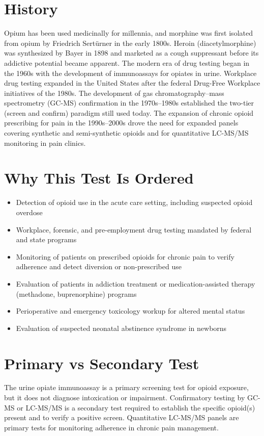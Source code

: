 \section*{History}
Opium has been used medicinally for millennia, and morphine was first isolated from opium by Friedrich Sertürner in the early 1800s. Heroin (diacetylmorphine) was synthesized by Bayer in 1898 and marketed as a cough suppressant before its addictive potential became apparent. The modern era of drug testing began in the 1960s with the development of immunoassays for opiates in urine. Workplace drug testing expanded in the United States after the federal Drug-Free Workplace initiatives of the 1980s. The development of gas chromatography--mass spectrometry (GC-MS) confirmation in the 1970s--1980s established the two-tier (screen and confirm) paradigm still used today. The expansion of chronic opioid prescribing for pain in the 1990s--2000s drove the need for expanded panels covering synthetic and semi-synthetic opioids and for quantitative LC-MS/MS monitoring in pain clinics.
\section*{Why This Test Is Ordered}
\begin{itemize}
  \item Detection of opioid use in the acute care setting, including suspected opioid overdose
  \item Workplace, forensic, and pre-employment drug testing mandated by federal and state programs
  \item Monitoring of patients on prescribed opioids for chronic pain to verify adherence and detect diversion or non-prescribed use
  \item Evaluation of patients in addiction treatment or medication-assisted therapy (methadone, buprenorphine) programs
  \item Perioperative and emergency toxicology workup for altered mental status
  \item Evaluation of suspected neonatal abstinence syndrome in newborns
\end{itemize}
\section*{Primary vs Secondary Test}
The urine opiate immunoassay is a primary screening test for opioid exposure, but it does not diagnose intoxication or impairment. Confirmatory testing by GC-MS or LC-MS/MS is a secondary test required to establish the specific opioid(s) present and to verify a positive screen. Quantitative LC-MS/MS panels are primary tests for monitoring adherence in chronic pain management.
